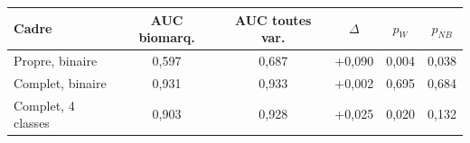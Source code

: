 \begin{tabular}{lccccc}
\toprule
Cadre & AUC biomarq. & AUC toutes var. & $\Delta$ & $p_W$ & $p_{NB}$ \\
\midrule
Propre, binaire & 0,597 & 0,687 & +0,090 & 0,004 & 0,038 \\
Complet, binaire & 0,931 & 0,933 & +0,002 & 0,695 & 0,684 \\
Complet, 4 classes & 0,903 & 0,928 & +0,025 & 0,020 & 0,132 \\
\bottomrule
\end{tabular}